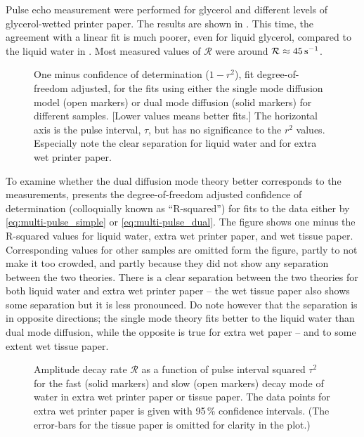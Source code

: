 \documentclass[11pt,a4paper, twocolumn,
swedish, english %
]{article}
\begin{document}
Pulse echo measurement were performed for glycerol and
different levels of glycerol-wetted printer paper. The results are
shown in . This time, the agreement with a linear fit
is much poorer, even for liquid glycerol, compared to the liquid water
in . Most measured values of $\mathcal{R}$ were
around $\mathcal{R}\approx\unit[45]{s^{-1}}$.


\begin{figure*}
\centering

\caption{One minus confidence of determination ($1-r^2$),
  fit degree-of-freedom adjusted, for the fits using either the single
  mode diffusion model (open markers) or dual mode diffusion (solid
  markers) for different samples. [Lower values means better fits.]
  The horizontal axis is the pulse interval, $\tau$, but has no
  significance to the $r^2$ values. Especially note the clear
  separation for liquid water and for extra wet printer paper.
} 
\label{fig:good-fit}
\end{figure*}

To examine whether the dual diffusion mode theory better corresponds
to the measurements,  presents the
degree-of-freedom adjusted confidence of determination (colloquially
known as ``R-squared'') for fits to the data either by
\eqref{eq:multi-pulse_simple} or \eqref{eq:multi-pulse_dual}. The
figure shows one minus the R-squared values for liquid water, extra
wet printer paper, and wet tissue paper. Corresponding values for other
samples are omitted form the figure, partly to not make it too
crowded, and partly because they did not show any separation between
the two theories. There is a clear separation between the two theories for
both liquid water and extra wet printer paper -- the wet tissue paper
also shows some separation but it is less
pronounced. Do note however that the separation is in opposite
directions; the single mode theory fits better to the liquid water
than dual mode diffusion, while the opposite is true for extra wet
paper -- and to some extent wet tissue paper. 


\begin{figure*}
\centering

\caption{Amplitude decay rate $\mathcal{R}$ as a function of pulse
  interval squared $\tau^2$ for the fast (solid markers) and slow
  (open markers) decay mode of water in extra wet printer paper or
  tissue paper. The data points for extra wet printer paper is given
  with 95\,\% confidence intervals. (The error-bars for the tissue
  paper is omitted for clarity in the plot.) } 
\label{fig:dual-diff}
\end{figure*}
\end{document}
